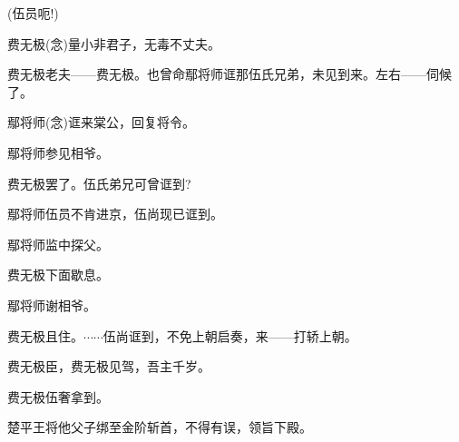 {(伍员\hspace{30pt}呃!)


\vspace{5pt}


\vspace{5pt}

费无极\hspace{20pt}({\akai 念})量小非君子，无毒不丈夫。

费无极\hspace{20pt}老夫------费无极。也曾命鄢将师诓那伍氏兄弟，未见到来。左右------伺候了。

鄢将师\hspace{20pt}({\akai 念})诓来棠公，回复将令。

鄢将师\hspace{20pt}参见相爷。

费无极\hspace{20pt}罢了。伍氏弟兄可曾诓到?

鄢将师\hspace{20pt}伍员不肯进京，伍尚现已诓到。

鄢将师\hspace{20pt}监中探父。

费无极\hspace{20pt}下面歇息。

鄢将师\hspace{20pt}谢相爷。

费无极\hspace{20pt}且住。$\cdots{}\cdots{}$伍尚诓到，不免上朝启奏，来------打轿上朝。

费无极\hspace{20pt}臣，费无极见驾，吾主千岁。

费无极\hspace{20pt}伍奢拿到。

楚平王\hspace{20pt}将他父子绑至金阶斩首，不得有误，领旨下殿。

}
